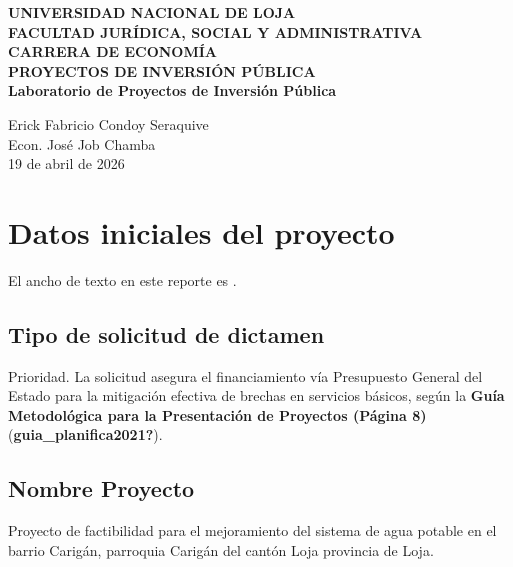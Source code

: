 \documentclass[12pt,spanish]{article}
\begin{document}
\begin{center}
    {\bfseries \Large UNIVERSIDAD NACIONAL DE LOJA}\\[0.3cm]
    {\bfseries \large FACULTAD JURÍDICA, SOCIAL Y
ADMINISTRATIVA}\\[0.2cm]
    {\bfseries CARRERA DE ECONOMÍA}\\[1.5cm]
    
    {\bfseries \large PROYECTOS DE INVERSIÓN PÚBLICA}\\[1cm]
    
    {\bfseries \Large Laboratorio de Proyectos de Inversión
Pública}\\[1.5cm]
\end{center}

\begin{center}
                        Erick Fabricio Condoy Seraquive \\
                \vspace{0.5cm}
    Econ. José Job Chamba \\ 
    19 de abril de 2026
\end{center}

\vspace{1cm}

\doublespacing
\setlength{\parindent}{1.27cm}

\section{Datos iniciales del
proyecto}\label{datos-iniciales-del-proyecto}

El ancho de texto en este reporte es \the\textwidth.

\subsection{Tipo de solicitud de
dictamen}\label{tipo-de-solicitud-de-dictamen}

Prioridad. La solicitud asegura el financiamiento vía Presupuesto
General del Estado para la mitigación efectiva de brechas en servicios
básicos, según la \textbf{Guía Metodológica para la Presentación de
Proyectos (Página 8)} (\textbf{guia\_planifica2021?}).

\subsection{Nombre Proyecto}\label{nombre-proyecto}

Proyecto de factibilidad para el mejoramiento del sistema de agua
potable en el barrio Carigán, parroquia Carigán del cantón Loja
provincia de Loja.
\end{document}
